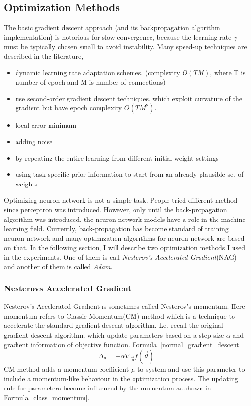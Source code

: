 \documentclass[officiallayout]{tktla}
\begin{document}
\subsection{Optimization Methods}


The basic gradient descent approach (and its backpropagation algorithm implementation) is notorious for slow convergence, because the learning rate $\gamma$ must be typically chosen small to avoid instability. Many speed-up techniques are described in the literature, 

\begin{itemize}
\item dynamic learning rate adaptation schemes. (complexity $O(TM)$, where T is number of epoch and M is number of connections)
\item use second-order gradient descent techniques, which exploit curvature of the gradient but have epoch complexity $O(TM^2)$. 
\item local error minimum
\item adding noise
\item by repeating the entire learning from different initial weight settings
\item using task-specific prior information to start from an already plausible set of weights
\end{itemize}


Optimizing neuron network is not a simple task. People tried different method since perceptron was introduced. However, only until the back-propagation algorithm was introduced, the neuron network models have a role in the machine learning field. Currently, back-propagation has become standard of training neuron network and many optimization algorithms for neuron network are based on that. In the following section, I will describe two optimization methods I used in the experiments. One of them is call \textit{Nesterov's Accelerated Gradient}(NAG) and another of them is called \textit{Adam}. 
\subsubsection{Nesterovs Accelerated Gradient}
Nesterov's Accelerated Gradient is sometimes called Nesterov's momentum. Here momentum refers to Classic Momentum(CM) method which is a technique to accelerate the standard gradient descent algorithm. Let recall the original gradient descent algorithm, which update parameters based on a step size $\alpha$ and gradient information of objective function. Formula~\ref{normal_gradient_descent}
\begin{equation}
\Delta_\theta = -\alpha \nabla_{\vec{\theta}} f(\vec{\theta})
\label{normal_gradient_descent}
\end{equation}
CM method adds a momentum coefficient $\mu$ to system and use this parameter to include a momentum-like behaviour in the optimization process. The updating rule for parameters become influenced by the momentum as shown in Formula~\ref{class_momentum}.
\end{document}
